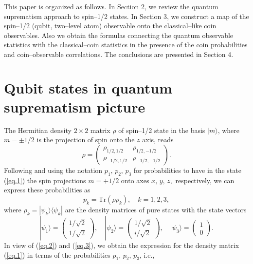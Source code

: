 \documentclass[12pt]{article}
\begin{document}
This paper is organized as follows. In Section 2, we review the quantum suprematism approach to spin--1/2 states. In Section 3, we construct a map of the spin--1/2 (qubit, two--level atom) observable onto the classical--like coin observables. Also  we obtain the formulas connecting the quantum observable statistics with the classical--coin statistics in the presence of the coin probabilities and coin--observable  correlations. The conclusions are presented in Section 4.




\section{Qubit states in quantum suprematism picture}
The Hermitian density $2\times2$ matrix $\rho$ of spin--1/2 state in the basis $|m\rangle$, where $m=\pm1/2$ is the projection of spin onto the $z$ axis, reads
\begin{equation}\label{eq.1}
\rho=
\left(\begin{array}{cc}
\rho_{1/2, 1/2}&\rho_{1/2, -1/2}\\
\rho_{-1/2, 1/2}&\rho_{-1/2, -1/2}
\end{array}\right).
\end{equation}
Following \cite{Ventrig2017} and using the notation $p_1,\,p_2,\,p_3$ for probabilities to have in the state (\ref{eq.1}) the spin projections $m=+1/2$ onto axes $x,\,y,\,z,$ respectively, we can express these probabilities as
\begin{equation}\label{eq.2}
p_k=\mbox{Tr}\left(\rho\rho_k\right),\quad k=1,2,3,
\end{equation}
where $\rho_k=|\psi_k\rangle\langle \psi_k|$ are the density matrices of pure states with the state vectors 
\begin{equation}\label{eq.3}
|\psi_1\rangle=\left(\begin{array}{c}
1/\sqrt2\\1/\sqrt2\end{array}\right),\quad |\psi_2\rangle=\left(\begin{array}{c}
1/\sqrt2\\i/
\sqrt2\end{array}\right),\quad |\psi_3\rangle=\left(\begin{array}{c}
1\\0\end{array}\right).
\end{equation}
In view of (\ref{eq.2}) and (\ref{eq.3}), we obtain the expression for the density matrix (\ref{eq.1}) in terms of the probabilities $p_1,\,p_2,\,p_3$, i.e.,  
\end{document}
